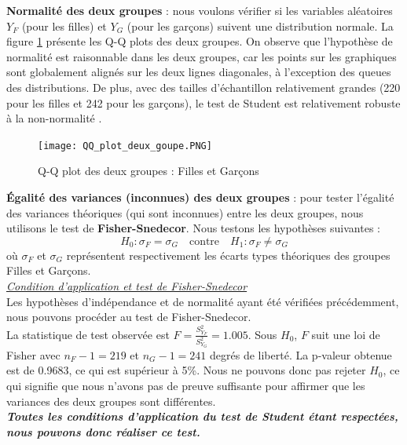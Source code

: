 \documentclass[12pt,a4paper]{article}
\begin{document}
\begin{enumerate}[label=\textbf{\alph*})]
\noindent
\textbf{Normalité des deux groupes} : nous voulons vérifier si les variables aléatoires $Y_F$ (pour les filles) et $Y_G$ (pour les garçons) suivent une distribution normale. La figure \ref{fig:QQplot_1} présente les Q-Q plots des deux groupes. On observe que l'hypothèse de normalité est raisonnable dans les deux groupes, car les points sur les graphiques sont globalement alignés sur les deux lignes diagonales, à l'exception des queues des distributions. De plus, avec des tailles d'échantillon relativement grandes (220 pour les filles et 242 pour les garçons), le test de Student est relativement robuste à la non-normalité \cite{poulin2023}.

\begin{figure}[H]
	\centering
	\texttt{[image: QQ\_plot\_deux\_goupe.PNG]}
	\caption{Q-Q plot des deux groupes : Filles et Garçons}
	\label{fig:QQplot_1}
\end{figure}

\noindent
\textbf{Égalité des variances (inconnues) des deux groupes} : pour tester l'égalité des variances théoriques (qui sont inconnues) entre les deux groupes, nous utilisons le test de \textbf{Fisher-Snedecor}. Nous testons les hypothèses suivantes :
\begin{equation*}
	H_0 : \sigma_F = \sigma_G \quad \text{contre} \quad H_1 : \sigma_F \neq \sigma_G
\end{equation*}
où $\sigma_F$ et $\sigma_G$ représentent respectivement les écarts types théoriques des groupes Filles et Garçons.\\

\noindent
\textit{\underline{Condition d'application et test de Fisher-Snedecor}} \\

Les hypothèses d'indépendance et de normalité ayant été vérifiées précédemment, nous pouvons procéder au test de Fisher-Snedecor.\\
La statistique de test observée est $F = \frac{S_{Y_F}^2}{S_{Y_G}^2} = 1.005$. Sous $H_0$, $F$ suit une loi de Fisher avec $n_F - 1 = 219$ et $n_G - 1 = 241$ degrés de liberté. La p-valeur obtenue est de 0.9683, ce qui est supérieur à 5\%. Nous ne pouvons donc pas rejeter $H_0$, ce qui signifie que nous n'avons pas de preuve suffisante pour affirmer que les variances des deux groupes sont différentes.\\

	
	\textbf{\textit{Toutes les conditions d'application du test de Student étant respectées, nous pouvons donc réaliser ce test.}} \\
	

\end{enumerate}
\end{document}
